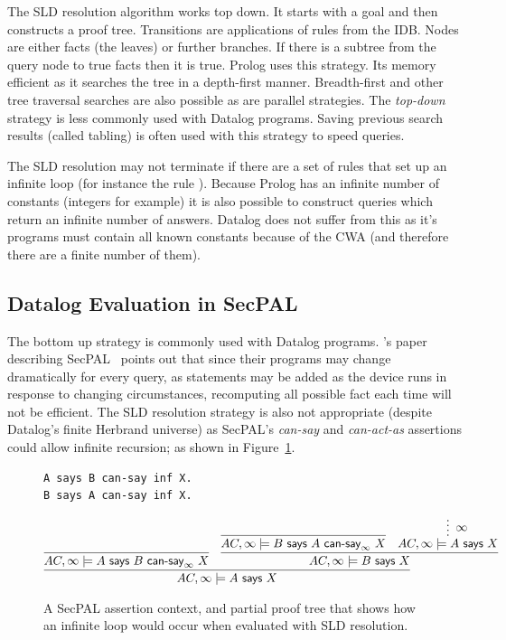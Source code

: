 \documentclass[a4paper]{article}
\begin{document}
The \ac{SLD} resolution algorithm works top down. It starts with a goal and then
constructs a proof tree. Transitions are applications of rules from the
\ac{IDB}. Nodes are either facts (the leaves) or further branches.  If there is
a subtree from the query node to true facts then it is true.  Prolog uses this
strategy.  Its memory efficient as it searches the tree in a depth-first manner.
Breadth-first and other tree traversal searches are also possible as are
parallel strategies.  The \emph{top-down} strategy is less commonly used with
Datalog programs. Saving previous search results (called tabling) is often used
with this strategy to speed queries.


The \ac{SLD} resolution may not terminate if there are a set of rules that set
up an infinite loop (for instance the rule ).  Because
Prolog has an infinite number of constants (integers for example) it is also
possible to construct queries which return an infinite number of answers.
Datalog does not suffer from this as it's programs must contain all known
constants because of the \ac{CWA} (and therefore there are a finite number of
them).


\subsection{Datalog Evaluation in SecPAL}

The bottom up strategy is commonly used with Datalog programs.
\citeauthor*{Becker:2009vt}'s paper describing SecPAL~\cite{Becker:2006vh}
points out that since their programs may change dramatically for every query, as
statements may be added as the device runs in response to changing
circumstances, recomputing all possible fact each time  will not be efficient.
The \ac{SLD} resolution strategy is also not appropriate (despite Datalog's
finite Herbrand universe) as SecPAL's \emph{can-say} and \emph{can-act-as}
assertions could allow infinite recursion; as shown in Figure~\ref{secpal:inf}.

\begin{figure}\centering
  \begin{lstlisting}[language=SecPAL]
A says B can-say inf X.
B says A can-say inf X.
  \end{lstlisting}
  \begin{align*}
    \infer{ AC,\infty \models A\textsf{~says~}X }{%
    \infer{AC,\infty \models A \textsf{~says~} B \textsf{~can-say}_\infty~X}{} &
    \infer{AC,\infty \models B \textsf{~says~} X}{%
      \infer{AC,\infty \models B \textsf{~says~} A \textsf{~can-say}_\infty~X}{} &
    \infer*[\infty]{AC,\infty \models A \textsf{~says~} X}{}
      }
    }
  \end{align*}
  \caption{A SecPAL assertion context, and partial proof tree that shows how an
    infinite loop would occur when evaluated with \ac{SLD} resolution.}
  \label{secpal:inf}
\end{figure}
\end{document}
